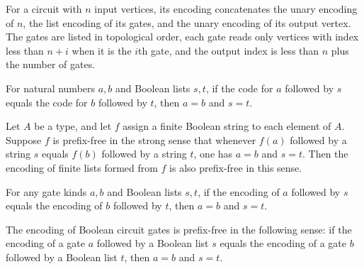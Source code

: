 \begin{definition}
\label{BoolCircuit.DAGCircuit.encode}
\leanok
{}
For a circuit with $n$ input vertices, its encoding concatenates the unary encoding of
$n$, the list encoding of its gates, and the unary encoding of its output vertex. The
gates are listed in topological order, each gate reads only vertices with index less
than $n+i$ when it is the $i$th gate, and the output index is less than $n$ plus the
number of gates.
\end{definition}

\begin{lemma}
\label{BoolCircuit.encodeNat_prefixFree}
\leanok
{}
For natural numbers $a,b$ and Boolean lists $s,t$, if the code for $a$ followed by $s$
equals the code for $b$ followed by $t$, then $a=b$ and $s=t$.
\end{lemma}

\begin{lemma}
\label{BoolCircuit.encodeList_prefixFree}
\leanok
{}
Let $A$ be a type, and let $f$ assign a finite Boolean string to each element of $A$.
Suppose $f$ is prefix-free in the strong sense that whenever $f(a)$ followed by a string
$s$ equals $f(b)$ followed by a string $t$, one has $a=b$ and $s=t$. Then the encoding
of finite lists formed from $f$ is also prefix-free in this sense.
\end{lemma}

\begin{lemma}
\label{BoolCircuit.GateKind.encode_prefixFree}
\leanok
{}
For any gate kinds $a,b$ and Boolean lists $s,t$, if the encoding of $a$ followed by $s$
equals the encoding of $b$ followed by $t$, then $a=b$ and $s=t$.
\end{lemma}

\begin{lemma}
\label{BoolCircuit.DAGGate.encode_prefixFree}
\leanok
{}
The encoding of Boolean circuit gates is prefix-free in the following sense: if the
encoding of a gate $a$ followed by a Boolean list $s$ equals the encoding of a gate $b$
followed by a Boolean list $t$, then $a=b$ and $s=t$.
\end{lemma}

